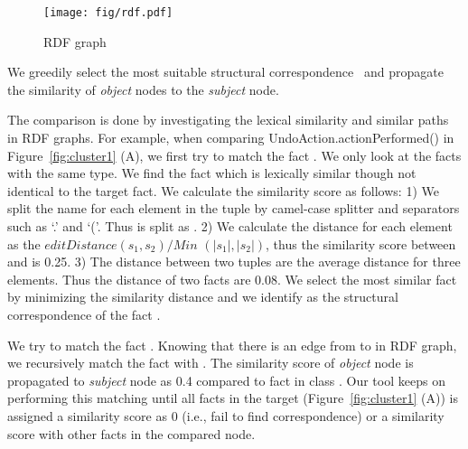 \begin{figure}[!htb]
    \begin{minipage}{0.5\textwidth}
    \centering
\texttt{[image: fig/rdf.pdf]}
 \end{minipage}%
   \caption{RDF graph}
 \label{fig:rdf}
   \end{figure}


 We greedily select the most suitable structural correspondence~\cite{Cottrell:jigsaw08} and propagate the similarity of {\it object} nodes to the {\it subject} node. 

 The comparison is done by investigating the lexical similarity and similar paths in RDF graphs. For example, when comparing UndoAction.actionPerformed() in Figure~\ref{fig:cluster1} (A), we first try to match the fact . We only look at the facts with the same type. We find  the fact   which is lexically similar though not identical to the target fact. We calculate the similarity score as follows: 1) We split the name for each element in the tuple by camel-case splitter and separators such as `.' and `('. Thus  is split as .  2) We calculate the distance for each element as the $ editDistance(s_1,s_2)/ Min$ $(|s_1|, |s_2|)$, thus the similarity score between  and  is 0.25. 3) The distance between two tuples are the average distance for three elements. Thus the distance of two facts are 0.08.   We select  the most similar  fact by minimizing the similarity distance and we identify  as the structural correspondence of the fact . 
 
We try to match the fact   . Knowing that there is an edge from  to  in RDF graph, we recursively match the fact   with  . The similarity score of {\it object} node  is propagated to {\it subject} node  as 0.4 compared to fact   in class .  Our tool keeps on performing this matching until all facts in the target (Figure~\ref{fig:cluster1} (A)) is assigned a similarity score as 0 (i.e., fail to find correspondence) or a similarity score with other facts in the compared node. 

